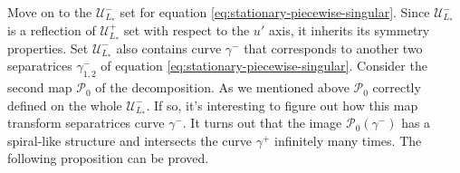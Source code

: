 Move on to the $\mathscr{U}_{L_*}^-$ set for equation \eqref{eq:stationary-piecewise-singular}.
Since $\mathscr{U}_{L_*}^-$ is a reflection of $\mathscr{U}_{L_*}^+$ set with respect to the $u'$ axis, it inherits its symmetry properties.
Set $\mathscr{U}_{L_*}^-$ also contains curve $\gamma^-$ that corresponds to another two separatrices $\gamma_{1,2}^-$ of equation \eqref{eq:stationary-piecewise-singular}.
Consider the second map $\mathcal{P}_0$ of the decomposition.
As we mentioned above $\mathcal{P}_0$ correctly defined on the whole $\mathscr{U}_{L_*}^-$.
If so, it's interesting to figure out how this map transform separatrices curve $\gamma^-$.
It turns out that the image $\mathcal{P}_0(\gamma^-)$ has a spiral-like structure and intersects the curve $\gamma^+$ infinitely many times.
The following proposition can be proved.

